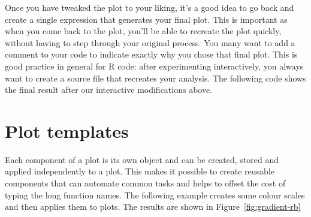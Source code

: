 % 


Once you have tweaked the plot to your liking, it's a good idea to go back and create a single expression that generates your final plot. This is important as when you come back to the plot, you'll be able to recreate the plot quickly, without having to step through your original process. You many want to add a comment to your code to indicate exactly why you chose that final plot. This is good practice in general for R code: after experimenting interactively, you always want to create a source file that recreates your analysis.  The following code shows the final result after our interactive modifications above.

% 


\section{Plot templates}
\label{sec:templates}

Each component of a \ggplot plot is its own object and can be created, stored and applied independently to a plot. This makes it possible to create reusable components that can automate common tasks and helps to offset the cost of typing the long function names. The following example creates some colour scales and then applies them to plots. The results are shown in Figure~\ref{fig:gradient-rb}

% 


